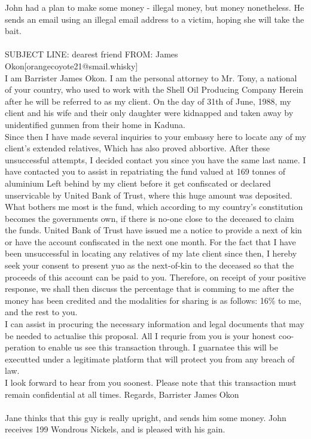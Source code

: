 \documentclass{article}
\begin{document}
John had a plan to make some money {-} illegal money, but money nonetheless.
He sends an email using an illegal email address to a victim, hoping she will take the bait.
\\\\
SUBJECT LINE: dearest friend
FROM: James Okon[orangecoyote21@smail.whisky]
\\
I am Barrister James Okon.
I am the personal attorney to Mr. Tony, a national of your country, who used to work with the Shell Oil Producing Company
Herein after he will be referred to as my client.
On the day of 31th of June, 1988, my client and his wife and their only daughter were kidnapped and taken away by unidentified gunmen from their home in Kaduna.
\\
Since then I have made several inquiries to your embassy here to locate any of my client's extended relatives, Which has also proved abbortive.
After these unsuccessful attempts, I decided contact you since you have the same last name.
I have contacted you to assist in repatriating the fund valued at 169 tonnes of aluminium Left behind by my client before it get confiscated or declared unservicable by United Bank of Trust, where this huge amount was deposited.
\\
What bothers me most is the fund, which according to my country's constitution becomes the governments own, if there is no{-}one close to the deceased to claim the funds.
United Bank of Trust have issued me a notice to provide a next of kin or have the account confiscated in the next one month.
For the fact that I have been unsuccessful in locating any relatives of my late client since then, I hereby seek your consent to present yuo as the next{-}of{-}kin to the deceased so that the proceeds of this account can be paid to you.
Therefore, on receipt of your positive response, we shall then discuss the percentage that is comming to me after the money has been credited and the modalities for sharing is as follows: 16\% to me, and the rest to you.
\\
I can assist in procuring the necessary information and legal documents that may be needed to actualise this proposal.
All I requrie from you is your honest coo{-}peration to enable us see this transaction through.
I guarnatee this will be executted under a legitimate platform that will protect you from any breach of law.
\\
I look forward to hear from you soonest.
Please note that this transaction must remain confidential at all times.
Regards, Barrister James Okon
\\\\
Jane thinks that this guy is really upright, and sends him some money.
John receives 199 Wondrous Nickels, and is pleased with his gain.
\end{document}
